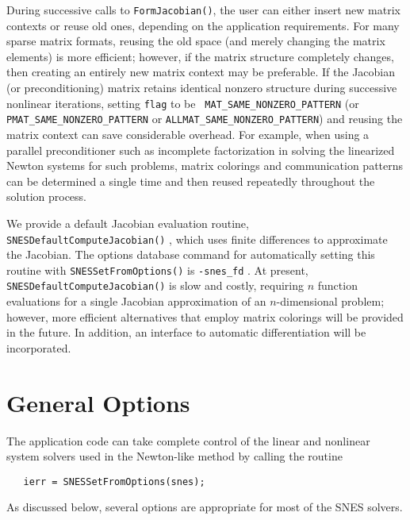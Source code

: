 During successive calls to {\tt FormJacobian()}, the user can either
insert new matrix contexts or reuse old ones, depending on the
application requirements. For many sparse matrix formats, reusing the
old space (and merely changing the matrix elements) is more efficient;
however, if the matrix structure completely changes, then creating an
entirely new matrix context may be preferable.  If the Jacobian (or
preconditioning) matrix retains identical nonzero structure during
successive nonlinear iterations, setting {\tt flag} to be {\tt
MAT\_SAME\_NONZERO\_PATTERN} (or {\tt PMAT\_SAME\_NONZERO\_PATTERN}
or {\tt ALLMAT\_SAME\_NONZERO\_PATTERN})
and  
reusing the matrix context can save 
considerable overhead.  For example, when using a parallel
preconditioner such as incomplete factorization in solving the
linearized Newton systems for such problems, matrix colorings and
communication patterns can be determined a single time and then
reused repeatedly throughout the solution process. 

We provide a default Jacobian evaluation routine, 
{\tt SNESDefaultComputeJacobian()} , 
which uses finite differences to approximate the Jacobian.  The
options database command for automatically setting this
routine with {\tt SNESSetFromOptions()} 
is {\tt -snes\_fd} . At present, 
{\tt SNESDefaultComputeJacobian()} is slow and costly, requiring $n$
function evaluations for a single Jacobian approximation of an
$n$-dimensional problem; however, more efficient alternatives that
employ matrix colorings will be provided in the future.  In
addition, an interface to automatic differentiation will be
incorporated.

\section{General Options}

The application code can take complete control of the linear and nonlinear
system 
solvers used in the Newton-like method by calling the routine
\begin{verbatim}
   ierr = SNESSetFromOptions(snes);
\end{verbatim}
As discussed below, several options are 
appropriate for most of the SNES solvers. 

